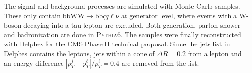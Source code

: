 \documentclass[10pt,a4paper]{article}
\newcommand{\W}{\text{W}}
\renewcommand{\b}{\text{b}}
\renewcommand{\tt}{\ensuremath{\text{t}\bar{\text{t}}}}
\newcommand{\lnu}{\ensuremath{\ell\nu}}
\newcommand{\MET}{\ensuremath{\cancel{\it{E}}_{T}}}
\begin{document}
The signal and background processes are simulated with Monte Carlo samples. These only contain \mbox{$\b\b\W\W \rightarrow \b\b qq\ell\nu$} at generator level, where events with a W-boson decaying into a tau lepton are excluded. Both generation, parton shower and hadronization are done in \textsc{Pythia6}. The samples were finally reconstructed with Delphes for the CMS Phase II technical proposal. %
Since the jets list in Delphes contains the leptons, jets within a cone of $\Delta R=0.2$ from a lepton and an energy difference $|p^j_T-p^\ell_T|/p^\ell_T=0.4$ are removed from the list. %

\end{document}
